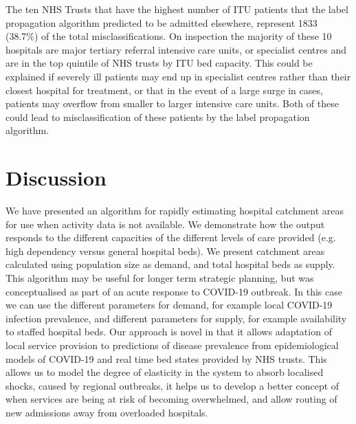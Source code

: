 \documentclass[twocolumn]{bmcart}%
\newcommand{\dataTopMisclass}{1833}
\newcommand{\dataTopMisclassPercent}{38.7\%}
\begin{document}

The ten NHS Trusts that have the highest number of ITU patients that the label propagation algorithm predicted to be 
admitted elsewhere, represent \dataTopMisclass{} (\dataTopMisclassPercent{}) of the total 
misclassifications. On inspection the majority of these 10 hospitals are major tertiary referral intensive care units, 
or specialist centres and are in the top quintile of NHS trusts by ITU bed capacity. This could be explained if 
severely ill patients may end up in specialist centres rather than their closest hospital for treatment, or that in the 
event of a large surge in cases, patients may overflow from smaller to larger intensive care units. Both of these 
could lead to misclassification of these patients by the label propagation algorithm.

\section*{Discussion}

We have presented an algorithm for rapidly estimating hospital catchment areas for use when activity data is not 
available. We demonstrate how the output responds to the different capacities of the different levels of care provided 
(e.g. high dependency versus general hospital beds). We present catchment areas calculated using population size as 
demand, and total hospital beds as supply. This algorithm may be useful for longer term strategic planning, but was 
conceptualised as part of an acute response to COVID-19 outbreak. In this case we can use the different parameters for 
demand, for example local COVID-19 infection prevalence, and different parameters for supply, for example availability 
to staffed hospital beds. Our approach is novel in that it allows adaptation of local service provision to predictions 
of disease prevalence from epidemiological models of COVID-19 and real time bed states provided by NHS trusts. This 
allows us to model the degree of elasticity in the system to absorb localised shocks, caused by regional outbreaks, it 
helps us to develop a better concept of when services are being at risk of becoming overwhelmed, and allow routing of 
new admissions away from overloaded hospitals.
\end{document}
